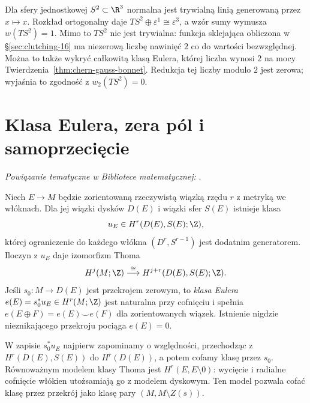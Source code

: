 \begin{przyklad}
\label{prz:sw-sfera-stabilna-21}
Dla sfery jednostkowej $S^2\subset\R^3$ normalna
jest trywialną linią generowaną przez $x\mapsto x$.
Rozkład ortogonalny daje
$TS^2\oplus\varepsilon^1\cong\varepsilon^3$,
a wzór sumy wymusza $w(TS^2)=1$.
Mimo to $TS^2$ nie jest trywialna:
funkcja sklejająca obliczona w §\ref{sec:clutching-16}
ma niezerową liczbę nawinięć $2$ co do wartości bezwzględnej.
Można to także wykryć całkowitą klasą Eulera,
której liczba wynosi $2$ na mocy
Twierdzenia~\ref{thm:chern-gauss-bonnet}.
Redukcja tej liczby modulo $2$ jest zerowa;
wyjaśnia to zgodność z $w_2(TS^2)=0$.
\end{przyklad}

\section{Klasa Eulera, zera pól i samoprzecięcie}
\label{sec:klasy-eulera-16}

\noindent\emph{Powiązanie tematyczne w Bibliotece matematycznej:} .

\begin{twierdzenie}
\label{thm:euler-thom-16}
Niech $E\to M$ będzie
zorientowaną rzeczywistą
wiązką rzędu $r$ z metryką
we włóknach. Dla jej
wiązki dysków $D(E)$
i wiązki sfer $S(E)$
istnieje klasa
\[
 u_E\in H^r(D(E),S(E);\Z),
\]
której ograniczenie do
każdego włókna
$(D^r,S^{r-1})$ jest
dodatnim generatorem.
Iloczyn z $u_E$ daje
izomorfizm Thoma
\[
 H^j(M;\Z)\stackrel{\cong}{\longrightarrow}
 H^{j+r}(D(E),S(E);\Z).
\]
Jeśli $s_0:M\to D(E)$
jest przekrojem zerowym,
to \emph{klasa Eulera}
$e(E)=s_0^*u_E\in H^r(M;\Z)$
jest naturalna przy
cofnięciu i spełnia
$e(E\oplus F)=e(E)\smile e(F)$
dla zorientowanych wiązek.
Istnienie nigdzie nieznikającego
przekroju pociąga $e(E)=0$.
\end{twierdzenie}

W zapisie $s_0^*u_E$ najpierw zapominamy o względności,
przechodząc z $H^r(D(E),S(E))$ do $H^r(D(E))$,
a potem cofamy klasę przez $s_0$. Równoważnym modelem
klasy Thoma jest $H^r(E,E\setminus0)$: wycięcie
i radialne cofnięcie włókien utożsamiają go z modelem
dyskowym. Ten model pozwala cofać klasę przez przekrój
jako klasę pary $(M,M\setminus Z(s))$.

